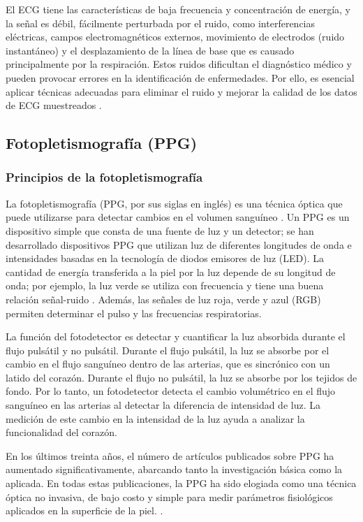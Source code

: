     El ECG tiene las características de baja frecuencia y concentración de energía, y la señal es débil, fácilmente perturbada por el ruido, como interferencias eléctricas, campos electromagnéticos externos, movimiento de electrodos (ruido instantáneo)  y el desplazamiento de la línea de base que es causado principalmente por la respiración. Estos ruidos dificultan el diagnóstico médico y pueden provocar errores en la identificación de enfermedades. Por ello, es esencial aplicar técnicas adecuadas para eliminar el ruido y mejorar la calidad de los datos de ECG muestreados \cite{AlMahamdy_2014}.

    \subsection{Fotopletismografía (PPG)}
        \subsubsection{Principios de la fotopletismografía}
            La fotopletismografía (PPG, por sus siglas en inglés) es una técnica óptica que puede utilizarse para detectar cambios en el volumen sanguíneo \cite{Hertzman_1938}. Un PPG es un dispositivo simple que consta de una fuente de luz y un detector; se han desarrollado dispositivos PPG que utilizan luz de diferentes longitudes de onda e intensidades basadas en la tecnología de diodos emisores de luz (LED). La cantidad de energía transferida a la piel por la luz depende de su longitud de onda; por ejemplo, la luz verde se utiliza con frecuencia y tiene una buena relación señal-ruido \cite{Challoner_1979}. Además, las señales de luz roja, verde y azul (RGB) permiten determinar el pulso y las frecuencias respiratorias.

            La función del fotodetector es detectar y cuantificar la luz absorbida durante el flujo pulsátil y no pulsátil. Durante el flujo pulsátil, la luz se absorbe por el cambio en el flujo sanguíneo dentro de las arterias, que es sincrónico con un latido del corazón. Durante el flujo no pulsátil, la luz se absorbe por los tejidos de fondo. Por lo tanto, un fotodetector detecta el cambio volumétrico en el flujo sanguíneo en las arterias al detectar la diferencia de intensidad de luz. La medición de este cambio en la intensidad de la luz ayuda a analizar la funcionalidad del corazón.

            En los últimos treinta años, el número de artículos publicados sobre PPG ha aumentado significativamente, abarcando tanto la investigación básica como la aplicada. En todas estas publicaciones, la PPG ha sido elogiada como una técnica óptica no invasiva, de bajo costo y simple para medir parámetros fisiológicos aplicados en la superficie de la piel. \cite{PPG}.

